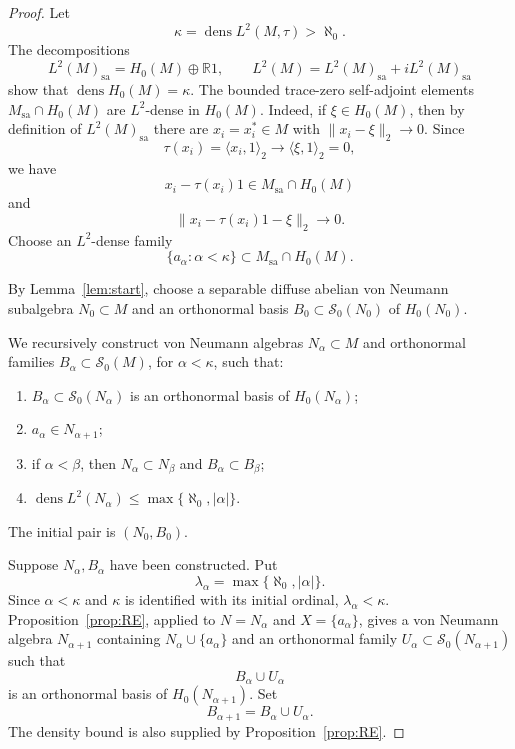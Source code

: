 \documentclass[11pt,letterpaper,reqno]{amsart}
\theoremstyle{definition}
\numberwithin{equation}{section}
\newcommand{\sa}{\mathrm{sa}}
\newcommand{\RR}{\mathbb R}
\newcommand{\one}{1}
\DeclareMathOperator{\dens}{dens}
\begin{document}
\begin{proof}
Let
\[
   \kappa=\dens L^2(M,\tau)>\aleph_0.
\]
The decompositions
\[
   L^2(M)_{\sa}=H_0(M)\oplus\RR\one,
   \qquad
   L^2(M)=L^2(M)_{\sa}+iL^2(M)_{\sa}
\]
show that $\dens H_0(M)=\kappa$. The bounded trace-zero self-adjoint elements $M_{\sa}\cap H_0(M)$ are
$L^2$-dense in $H_0(M)$.  Indeed, if $\xi\in H_0(M)$, then by definition of
$L^2(M)_{\sa}$ there are $x_i=x_i^*\in M$ with
$\|x_i-\xi\|_2\to0$.  Since
\[
   \tau(x_i)=\langle x_i,1\rangle_2\longrightarrow
   \langle \xi,1\rangle_2=0,
\]
we have
\[
   x_i-\tau(x_i)1\in M_{\sa}\cap H_0(M)
\]
and
\[
   \|x_i-\tau(x_i)1-\xi\|_2\to0.
\] 
Choose an $L^2$-dense family
\[
   \{a_\alpha:\alpha<\kappa\}\subset M_{\sa}\cap H_0(M).
\]

By Lemma~\ref{lem:start}, choose a separable diffuse abelian von Neumann subalgebra $N_0\subset M$ and an orthonormal basis $B_0\subset\mathcal S_0(N_0)$ of $H_0(N_0)$.

We recursively construct von Neumann algebras $N_\alpha\subset M$ and orthonormal families $B_\alpha\subset\mathcal S_0(M)$, for $\alpha<\kappa$, such that:
\begin{enumerate}[label=(\roman*)]
\item \(B_\alpha\subset\mathcal S_0(N_\alpha)\) is an orthonormal basis of \(H_0(N_\alpha)\);
\item $a_\alpha\in N_{\alpha+1}$;
\item if $\alpha<\beta$, then $N_\alpha\subset N_\beta$ and $B_\alpha\subset B_\beta$;
\item $\dens L^2(N_\alpha)\leq\max\{\aleph_0,|\alpha|\}$.
\end{enumerate}
The initial pair is $(N_0,B_0)$.

Suppose $N_\alpha,B_\alpha$ have been constructed.  Put
\[
   \lambda_\alpha=\max\{\aleph_0,|\alpha|\}.
\]
Since $\alpha<\kappa$ and $\kappa$ is identified with its initial ordinal, $\lambda_\alpha<\kappa$.  Proposition~\ref{prop:RE}, applied to \(N=N_\alpha\) and
\(X=\{a_\alpha\}\), gives a von Neumann algebra \(N_{\alpha+1}\) containing
\(N_\alpha\cup\{a_\alpha\}\) and an orthonormal family
\(U_\alpha\subset\mathcal S_0(N_{\alpha+1})\) such that
\[
   B_\alpha\cup U_\alpha
\]
is an orthonormal basis of \(H_0(N_{\alpha+1})\).  Set
\[
   B_{\alpha+1}=B_\alpha\cup U_\alpha .
\]
The density bound is also supplied by Proposition~\ref{prop:RE}.


\end{proof}
\end{document}
